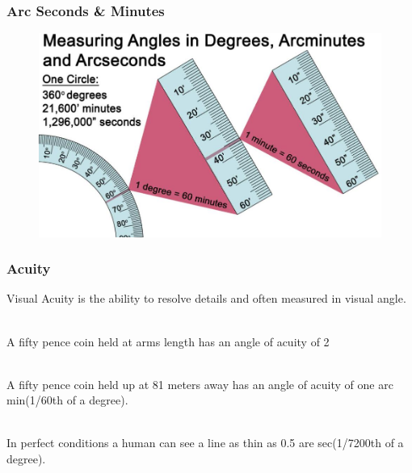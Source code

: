 
\begin{frame}
	\frametitle{Arc Seconds \& Minutes}
	\pause
	\begin{figure}
		\includegraphics[scale=.4]{assets/arc} 
	\end{figure}
\end{frame}

\begin{frame}
	\frametitle{Acuity}
	Visual Acuity is the ability to resolve details and often measured in visual angle. \\~\\ \pause
	
	A fifty pence coin held at arms length has an angle of acuity of 2\degree \\~\\ \pause
	
	A fifty pence coin held up at 81 meters away has an angle of acuity of one arc min(1/60th of a degree). \\~\\ \pause
	
	In perfect conditions a human can see a line as thin as 0.5 are sec(1/7200th of a degree). 
\end{frame}

